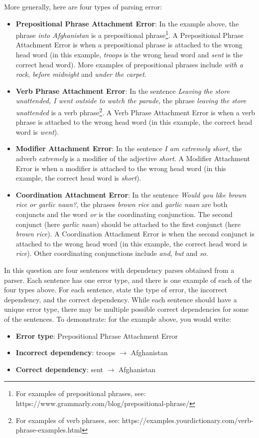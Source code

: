 \begin{parts}
    More generally, here are four types of parsing error:
    \begin{itemize}
        \item \textbf{Prepositional Phrase Attachment Error}: In the example above, the phrase \textit{into Afghanistan} is a prepositional phrase\footnote{For examples of prepositional phrases, see: https://www.grammarly.com/blog/prepositional-phrase/}.
              A Prepositional Phrase Attachment Error is when a prepositional phrase is attached to the wrong head word (in this example, \textit{troops} is the wrong head word and \textit{sent} is the correct head word).
              More examples of prepositional phrases include \textit{with a rock}, \textit{before midnight} and \textit{under the carpet}.
        \item \textbf{Verb Phrase Attachment Error}: In the sentence \textit{Leaving the store unattended, I went outside to watch the parade}, the phrase \textit{leaving the store unattended} is a verb phrase\footnote{For examples of verb phrases, see: https://examples.yourdictionary.com/verb-phrase-examples.html}.
              A Verb Phrase Attachment Error is when a verb phrase is attached to the wrong head word (in this example, the correct head word is \textit{went}).
        \item \textbf{Modifier Attachment Error}: In the sentence \textit{I am extremely short}, the adverb \textit{extremely} is a modifier of the adjective \textit{short}. A Modifier Attachment Error is when a modifier is attached to the wrong head word (in this example, the correct head word is \textit{short}).
        \item \textbf{Coordination Attachment Error}: In the sentence \textit{Would you like brown rice or garlic naan?}, the phrases \textit{brown rice} and \textit{garlic naan} are both conjuncts and the word \textit{or} is the coordinating conjunction. The second conjunct (here \textit{garlic naan}) should be attached to the first conjunct (here \textit{brown rice}). A Coordination Attachment Error is when the second conjunct is attached to the wrong head word (in this example, the correct head word is \textit{rice}). Other coordinating conjunctions include \textit{and}, \textit{but} and \textit{so}.
    \end{itemize}
    In this question are four sentences with dependency parses obtained from a parser. Each sentence has one error type, and there is one example of each of the four types above.
    For each sentence, state the type of error, the incorrect dependency, and the correct dependency. While each sentence should have a unique error type, there may be multiple possible correct dependencies for some of the sentences.
    To demonstrate: for the example above, you would write:
    \begin{itemize}
        \item \textbf{Error type}: Prepositional Phrase Attachment Error
        \item \textbf{Incorrect dependency}: troops $\rightarrow$ Afghanistan
        \item \textbf{Correct dependency}: sent $\rightarrow$ Afghanistan
    \end{itemize}


\end{parts}
